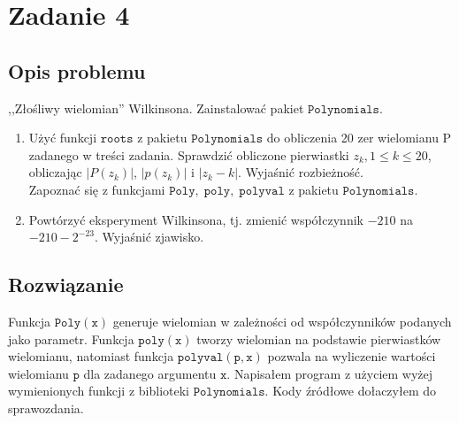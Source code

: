 \section{Zadanie 4}
\subsection{Opis problemu}
,,Złośliwy wielomian'' Wilkinsona. Zainstalować pakiet $ \mathtt{Polynomials} $.
\begin{enumerate}[label=(\alph*)]
  \item Użyć funkcji $ \mathtt{roots} $ z pakietu $ \mathtt{Polynomials} $ do obliczenia 20 zer wielomianu P zadanego w treści zadania. Sprawdzić obliczone pierwiastki $ z_k, 1 \leq k \leq 20 $, obliczając $|P(z_k)|$, $|p(z_k)|$ i $|z_k - k|$. Wyjaśnić rozbieżność. \\
  Zapoznać się z funkcjami $ \mathtt{Poly},\; \mathtt{poly},\; \mathtt{polyval}$ z pakietu $ \mathtt{Polynomials} $.
  \item Powtórzyć eksperyment Wilkinsona, tj. zmienić współczynnik $-210$ na $ -210-2^{-23}$. Wyjaśnić zjawisko.
\end{enumerate}
\subsection{Rozwiązanie}
Funkcja $ \mathtt{Poly(x)} $ generuje wielomian w zależności od współczynników podanych jako parametr.
Funkcja $ \mathtt{poly(x)} $ tworzy wielomian na podstawie pierwiastków wielomianu, natomiast funkcja $ \mathtt{polyval(p, x)} $ pozwala na wyliczenie wartości wielomianu $ \mathtt{p} $ dla zadanego argumentu $ \mathtt{x} $. Napisałem program z użyciem wyżej wymienionych funkcji z biblioteki $ \mathtt{Polynomials} $. Kody źródłowe dołaczyłem do sprawozdania. 

